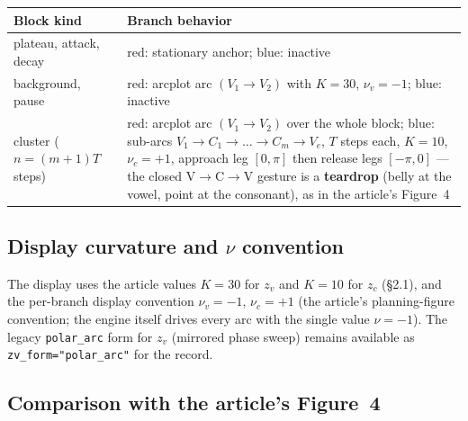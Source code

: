 \documentclass[11pt,a4paper]{article}
\begin{document}
\begin{center}
\begin{tabularx}{\textwidth}{@{}>{\raggedright\arraybackslash}p{}X@{}}
\toprule
\textbf{Block kind} & \textbf{Branch behavior} \\
\midrule
plateau, attack, decay & red: stationary anchor; blue: inactive \\
background, pause & red: arcplot arc $(V_1 \to V_2)$ with $K=30$,
                  $\nu_v = -1$; blue: inactive \\
cluster ($n = (m{+}1)T$ steps) & red: arcplot arc $(V_1 \to V_2)$ over
                  the whole block; blue: sub-arcs $V_1 \to C_1 \to
                  \dots \to C_m \to V_e$, $T$ steps each, $K=10$,
                  $\nu_c = +1$, approach leg $[0, \pi]$ then release
                  legs $[-\pi, 0]$ --- the closed V$\to$C$\to$V
                  gesture is a \textbf{teardrop} (belly at the vowel,
                  point at the consonant), as in the article's
                  Figure~4 \\
\bottomrule
\end{tabularx}
\end{center}

\subsection{Display curvature and $\nu$ convention}

The display uses the article values $K = 30$ for $z_v$ and $K = 10$
for $z_c$ (\S2.1), and the per-branch display convention
$\nu_v = -1$, $\nu_c = +1$ (the article's planning-figure convention;
the engine itself drives every arc with the single value $\nu = -1$).
The legacy \texttt{polar\_arc} form for $z_v$ (mirrored phase sweep)
remains available as \texttt{zv\_form="polar\_arc"} for the record.

\subsection{Comparison with the article's Figure~4}
\end{document}
